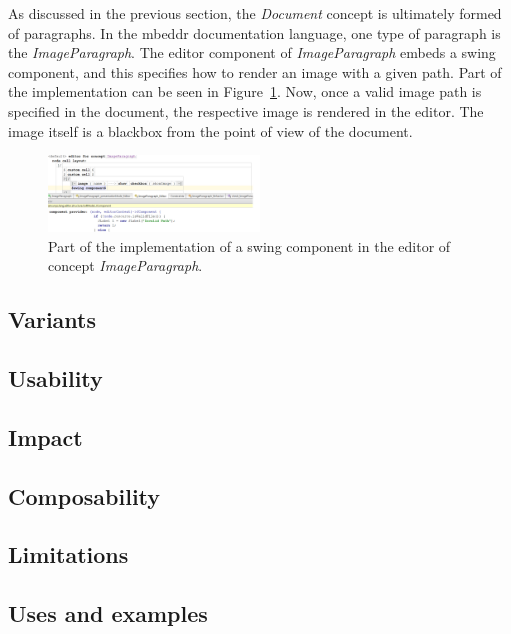 \documentclass[preprint,numbers,10pt]{sigplanconf}
\begin{document}
As discussed in the previous section, the \emph{Document} concept is ultimately formed of paragraphs.
In the mbeddr documentation language, one type of paragraph is the \emph{ImageParagraph}. The editor
component of \emph{ImageParagraph} embeds a swing component, and this specifies how to render an image
with a given path. Part of the implementation can be seen in Figure~\ref{fig:EditorImageParagraph}.
Now, once a valid image path is specified in the document, the respective image
is rendered in the editor. The image itself is a blackbox from the point of view of the document.

\begin{figure}[H]
	\centering
	\includegraphics[width=0.50\textwidth]{screens/EditorImageParagraph.png}
	\caption{Part of the implementation of a swing component in the editor of concept \emph{ImageParagraph}.}
	\label{fig:EditorImageParagraph}
\end{figure}
\subsection{Variants}

\subsection{Usability}

\subsection{Impact}

\subsection{Composability}

\subsection{Limitations}

\subsection{Uses and examples}
\end{document}
